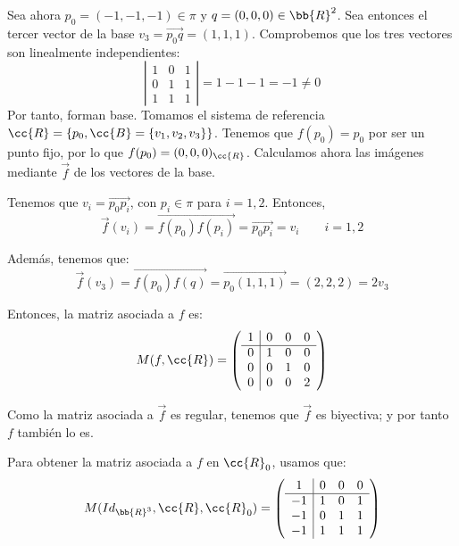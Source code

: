 \begin{ejercicio}
    Sea ahora $p_0=(-1,-1,-1)\in \pi$ y $q=(0,0,0)\in \bb{R}^2$. Sea entonces el tercer vector de la base $v_3=\vec{p_0q} = (1,1,1)$. Comprobemos que los tres vectores son linealmente independientes:
    \begin{equation*}
        \left|\begin{array}{ccc}
            1 & 0 & 1 \\
            0 & 1 & 1\\
            1 & 1 & 1
        \end{array}\right| = 1 - 1 -1 = -1\neq 0
    \end{equation*}
    Por tanto, forman base. Tomamos el sistema de referencia $\cc{R}=\{p_0, \cc{B}=\{v_1,v_2,v_3\}\}$. Tenemos que $f(p_0)=p_0$ por ser un punto fijo, por lo que $f(p_0)=(0,0,0)_{\cc{R}}$. Calculamos ahora las imágenes mediante $\vec{f}$ de los vectores de la base.

    Tenemos que $v_i=\vec{p_0p_i}$, con $p_i\in \pi$ para $i=1,2$. Entonces,
    \begin{equation*}
        \vec{f}(v_i) = \vec{f(p_0)f(p_i)} = \vec{p_0p_i} = v_i \qquad i=1,2
    \end{equation*}

    Además, tenemos que:
    \begin{equation*}
        \vec{f}(v_3) = \vec{f(p_0)f(q)} = \vec{p_0(1,1,1)} = (2,2,2) = 2v_3
    \end{equation*}

    Entonces, la matriz asociada a $f$ es:
    \begin{equation*}
        M(f,\cc{R}) = \left(
        \begin{array}{c|ccc}
            1 & 0 & 0 & 0 \\ \hline
            0 & 1 & 0 & 0 \\
            0 & 0 & 1 & 0 \\
            0 & 0 & 0 & 2
        \end{array} \right)
    \end{equation*}

    Como la matriz asociada a $\vec{f}$ es regular, tenemos que $\vec{f}$ es biyectiva; y por tanto $f$ también lo es.

    Para obtener la matriz asociada a $f$ en $\cc{R}_0$, usamos que:
    \begin{equation*}
        M(Id_{\bb{R}^3},\cc{R}, \cc{R}_0) = \left(
        \begin{array}{c|ccc}
            1 & 0 & 0 & 0 \\ \hline
            -1 & 1 & 0 & 1 \\
            -1 & 0 & 1 & 1 \\
            -1 & 1 & 1 & 1
        \end{array} \right)
    \end{equation*}


\end{ejercicio}
